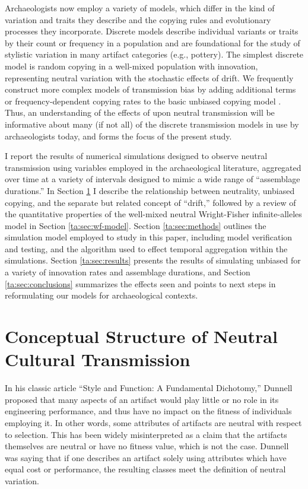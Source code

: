 Archaeologists now employ a variety of \ct models, which differ in the kind of variation and traits they describe and the copying rules and evolutionary processes they incorporate.  Discrete models describe individual variants or traits by their count or frequency in a population and are foundational for the study of stylistic variation in many artifact categories (e.g., pottery).  The simplest discrete  model is random copying in a well-mixed population with innovation, representing neutral variation with the stochastic effects of drift.  We frequently construct more complex models of transmission bias by adding additional terms or frequency-dependent copying rates to the basic unbiased copying model \citep{cavalli1973cultural,cavalli1973models,CF1981,BR1985}.  Thus, an understanding of the effects of \timeav upon neutral transmission will be informative about many (if not all) of the discrete transmission models in use by archaeologists today, and forms the focus of the present study.  

I report the results of numerical simulations designed to observe neutral transmission using variables employed in the archaeological literature, aggregated over time at a variety of intervals designed to mimic a wide range of ``assemblage durations.''  In Section \ref{ta:sec:concept-review} I describe the relationship between neutrality, unbiased copying, and the separate but related concept of ``drift,'' followed by a review of the quantitative properties of the well-mixed neutral Wright-Fisher infinite-alleles model in Section \ref{ta:sec:wf-model}.  Section \ref{ta:sec:methods} outlines the simulation model employed to study \timeav in this paper, including model verification and testing, and the algorithm used to effect temporal aggregation within the simulations.  Section \ref{ta:sec:results} presents the results of simulating unbiased \ct for a variety of innovation rates and assemblage durations, and Section \ref{ta:sec:conclusions} summarizes the effects seen and points to next steps in reformulating our \ct models for archaeological contexts.  


\section{Conceptual Structure of Neutral Cultural Transmission}
\label{ta:sec:concept-review}

In his classic article “Style and Function: A Fundamental Dichotomy,” Dunnell \citeyearpar{Dunnell1978} proposed that many aspects of an artifact would play little or no role in its engineering performance, and thus have no impact on the fitness of individuals employing it. In other words, some attributes of artifacts are neutral with respect to selection.  This has been widely misinterpreted as a claim that the artifacts themselves are neutral or have no fitness value, which is not the case. Dunnell was saying that if one describes an artifact solely using attributes which have equal cost or performance, the resulting classes meet the definition of neutral variation.  

